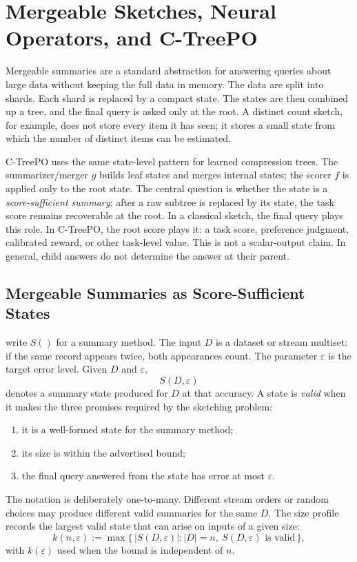 \section{Mergeable Sketches, Neural Operators, and C-TreePO}
\label{app:v6-mergeable-sketches}

Mergeable summaries are a standard abstraction for answering queries about
large data without keeping the full data in memory.  The data are split into
shards.  Each shard is replaced by a compact state.  The states are then
combined up a tree, and the final query is asked only at the root.  A distinct
count sketch, for example, does not store every item it has seen; it stores a
small state from which the number of distinct items can be estimated.

C-TreePO uses the same state-level pattern for learned compression trees.  The
summarizer/merger \(g\) builds leaf states and merges internal states; the
scorer \(f\) is applied only to the root state.  The central question is
whether the state is a \emph{score-sufficient summary}: after a raw subtree is
replaced by its state, the task score remains recoverable at the root.  In a
classical sketch, the final query plays this role.  In C-TreePO, the root
score plays it: a task score, preference judgment, calibrated reward, or other
task-level value.  This is not a scalar-output claim.  In general, child
answers do not determine the answer at their parent.

\subsection{Mergeable Summaries as Score-Sufficient States}
\label{app:v6-mergeable-pattern}

\citet{Agarwal2013MergeableTODS} write \(S()\) for a summary method.  The
input \(D\) is a dataset or stream multiset: if the same record appears twice,
both appearances count.  The parameter \(\varepsilon\) is the target error
level.  Given \(D\) and \(\varepsilon\),
\[
  S(D,\varepsilon)
\]
denotes a summary state produced for \(D\) at that accuracy.  A state is
\emph{valid} when it makes the three promises required by the sketching
problem:
\begin{enumerate}[leftmargin=1.5em]
\item it is a well-formed state for the summary method;
\item its size is within the advertised bound;
\item the final query answered from the state has error at most
\(\varepsilon\).
\end{enumerate}
The notation is deliberately one-to-many.  Different stream orders or random
choices may produce different valid summaries for the same \(D\).  The size
profile records the largest valid state that can arise on inputs of a given
size:
\[
  k(n,\varepsilon)
  :=
  \max\{\, |S(D,\varepsilon)| : |D|=n,\ S(D,\varepsilon)
    \text{ is valid}\,\},
\]
with \(k(\varepsilon)\) used when the bound is independent of \(n\).

